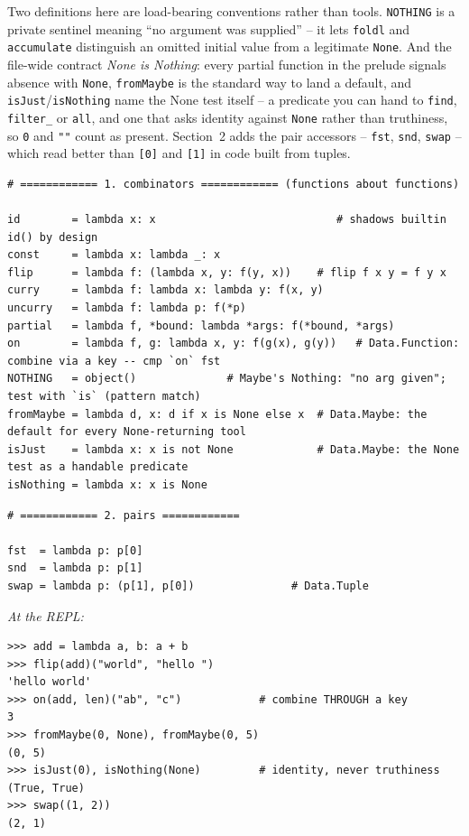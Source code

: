 \documentclass[11pt,letterpaper]{book}
\begin{document}
Two definitions here are load-bearing conventions rather than tools.
\texttt{NOTHING} is a private sentinel meaning ``no argument was supplied'' --
it lets \texttt{foldl} and \texttt{accumulate} distinguish an omitted initial
value from a legitimate \texttt{None}. And the file-wide contract \emph{None is
Nothing}: every partial function in the prelude signals absence with
\texttt{None}, \texttt{fromMaybe} is the standard way to land a default, and
\texttt{isJust}/\texttt{isNothing} name the None test itself -- a predicate
you can hand to \texttt{find}, \texttt{filter\_} or \texttt{all}, and one that
asks identity against \texttt{None} rather than truthiness, so \texttt{0} and
\texttt{""} count as present.
Section~2 adds the pair accessors -- \texttt{fst}, \texttt{snd}, \texttt{swap}
-- which read better than \texttt{[0]} and \texttt{[1]} in code built from
tuples.
\begin{lstlisting}[style=code]
# ============ 1. combinators ============ (functions about functions)

id        = lambda x: x                            # shadows builtin id() by design
const     = lambda x: lambda _: x
flip      = lambda f: (lambda x, y: f(y, x))    # flip f x y = f y x
curry     = lambda f: lambda x: lambda y: f(x, y)
uncurry   = lambda f: lambda p: f(*p)
partial   = lambda f, *bound: lambda *args: f(*bound, *args)
on        = lambda f, g: lambda x, y: f(g(x), g(y))   # Data.Function: combine via a key -- cmp `on` fst
NOTHING   = object()              # Maybe's Nothing: "no arg given"; test with `is` (pattern match)
fromMaybe = lambda d, x: d if x is None else x  # Data.Maybe: the default for every None-returning tool
isJust    = lambda x: x is not None             # Data.Maybe: the None test as a handable predicate
isNothing = lambda x: x is None
\end{lstlisting}
\begin{lstlisting}[style=code]
# ============ 2. pairs ============

fst  = lambda p: p[0]
snd  = lambda p: p[1]
swap = lambda p: (p[1], p[0])               # Data.Tuple
\end{lstlisting}

\noindent\textit{At the REPL:}
\begin{lstlisting}[style=spec]
>>> add = lambda a, b: a + b
>>> flip(add)("world", "hello ")
'hello world'
>>> on(add, len)("ab", "c")            # combine THROUGH a key
3
>>> fromMaybe(0, None), fromMaybe(0, 5)
(0, 5)
>>> isJust(0), isNothing(None)         # identity, never truthiness
(True, True)
>>> swap((1, 2))
(2, 1)
\end{lstlisting}
\end{document}
